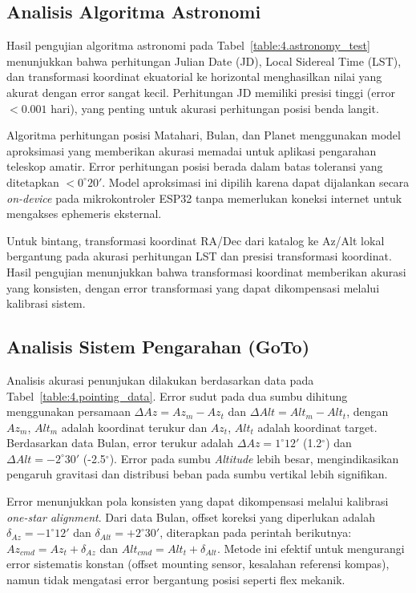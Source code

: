 \subsection{Analisis Algoritma Astronomi} \label{IV.AnalisisAstronomy}
Hasil pengujian algoritma astronomi pada Tabel~\ref{table:4.astronomy_test} menunjukkan bahwa perhitungan Julian Date (JD), Local Sidereal Time (LST), dan transformasi koordinat ekuatorial ke horizontal menghasilkan nilai yang akurat dengan error sangat kecil. Perhitungan JD memiliki presisi tinggi (error $< 0.001$ hari), yang penting untuk akurasi perhitungan posisi benda langit. \par

Algoritma perhitungan posisi Matahari, Bulan, dan Planet menggunakan model aproksimasi yang memberikan akurasi memadai untuk aplikasi pengarahan teleskop amatir. Error perhitungan posisi berada dalam batas toleransi yang ditetapkan $< 0^\circ20'$. Model aproksimasi ini dipilih karena dapat dijalankan secara \textit{on-device} pada mikrokontroler ESP32 tanpa memerlukan koneksi internet untuk mengakses ephemeris eksternal. \par

Untuk bintang, transformasi koordinat RA/Dec dari katalog ke Az/Alt lokal bergantung pada akurasi perhitungan LST dan presisi transformasi koordinat. Hasil pengujian menunjukkan bahwa transformasi koordinat memberikan akurasi yang konsisten, dengan error transformasi yang dapat dikompensasi melalui kalibrasi sistem. \par

\subsection{Analisis Sistem Pengarahan (GoTo)} \label{IV.AnalisisPointing}
Analisis akurasi penunjukan dilakukan berdasarkan data pada Tabel~\ref{table:4.pointing_data}. Error sudut pada dua sumbu dihitung menggunakan persamaan $\Delta Az = Az_m - Az_t$ dan $\Delta Alt = Alt_m - Alt_t$, dengan $Az_m$, $Alt_m$ adalah koordinat terukur dan $Az_t$, $Alt_t$ adalah koordinat target. Berdasarkan data Bulan, error terukur adalah $\Delta Az = 1^{\circ}12'$ (1.2$^{\circ}$) dan $\Delta Alt = -2^{\circ}30'$ (-2.5$^{\circ}$). Error pada sumbu \textit{Altitude} lebih besar, mengindikasikan pengaruh gravitasi dan distribusi beban pada sumbu vertikal lebih signifikan. \par


Error menunjukkan pola konsisten yang dapat dikompensasi melalui kalibrasi \textit{one-star alignment}. Dari data Bulan, offset koreksi yang diperlukan adalah $\delta_{Az} = -1^{\circ}12'$ dan $\delta_{Alt} = +2^{\circ}30'$, diterapkan pada perintah berikutnya: $Az_{cmd} = Az_t + \delta_{Az}$ dan $Alt_{cmd} = Alt_t + \delta_{Alt}$. Metode ini efektif untuk mengurangi error sistematis konstan (offset mounting sensor, kesalahan referensi kompas), namun tidak mengatasi error bergantung posisi seperti flex mekanik. \par

